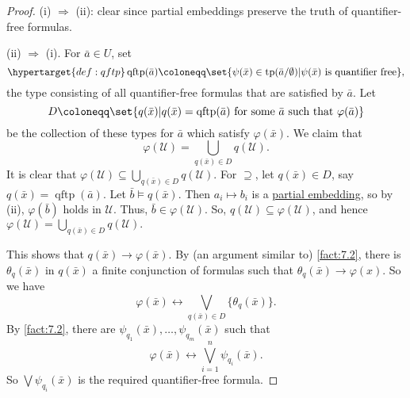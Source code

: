 \documentclass{article}
\let\models\vDash
\DeclareMathOperator{\tp}{tp}
\DeclareMathOperator{\qftp}{qftp}
\newcommand{\named}[1]{\textbf{#1}\index{#1}}
\begin{document}
\begin{proof}
  (i) $\Rightarrow$ (ii): clear since partial embeddings preserve the truth of quantifier-free formulas.

  (ii) $\Rightarrow$ (i). For $\bar{a} \in U$, set
  \begin{equation*}
    \hypertarget{def:qftp}\qftp(\bar{a}) \coloneqq \set{\psi(\bar{x}) \in \tp(\bar a/\emptyset) | \psi(\bar{x}) \text{ is quantifier free}},
  \end{equation*}
  the type consisting of all quantifier-free formulas that are satisfied by $\bar a$.
  Let
  \begin{equation*}
  D \coloneqq \set{q(\bar{x}) | q(\bar{x}) = \qftp(\bar{a}) \text{ for some }\bar{a} \text{ such that } \varphi(\bar{a})}
  \end{equation*}
  be the collection of these types for $\bar a$ which satisfy $\varphi(\bar x)$.
  We claim that \[ \varphi(\mathcal U) = \bigcup_{q(\bar{x}) \in D} q(\mathcal U). \]
  It is clear that $\varphi(\mathcal U) \subseteq \bigcup_{q(\bar{x}) \in D} q(\mathcal U).$ For $\supseteq$, let $q(\bar x) \in D$, say $q(\bar x) = \qftp(\bar a)$. Let $\bar b \models q(\bar x)$.
  Then $a_i \mapsto b_i$ is a \hyperlink{def:upe}{partial embedding}, so by (ii), $\varphi(\bar b)$ holds in $\mathcal{U}$. Thus, $\bar b \in \varphi(\mathcal U)$. So, $q(\mathcal{U}) \subseteq \varphi(\mathcal{U})$, and hence $\varphi(\mathcal U) = \bigcup_{q(\bar{x}) \in D} q(\mathcal U).$
  
  This shows that $q(\bar x) \rightarrow \varphi(\bar x)$.  
  By (an argument similar to) \cref{fact:7.2}, there is $\theta_q(\bar{x})$ in $q(\bar{x})$ a finite conjunction of formulas such that $\theta_q(\bar{x}) \to \varphi(x)$.
  So we have
  \begin{equation*}
    \varphi(\bar{x}) \leftrightarrow \bigvee_{q(\bar{x}) \in D} \{\theta_q(\bar{x})\}.
  \end{equation*}
  By \cref{fact:7.2}, there are $\psi_{q_1}(\bar{x}), \dotsc, \psi_{q_m}(\bar{x})$ such that
  \begin{equation*}
    \varphi(\bar{x}) \leftrightarrow \bigvee_{i=1}^n \psi_{q_i}(\bar{x}).
  \end{equation*}
  So $\bigvee \psi_{q_i}(\bar{x})$ is the required quantifier-free formula.
\end{proof}
\end{document}
